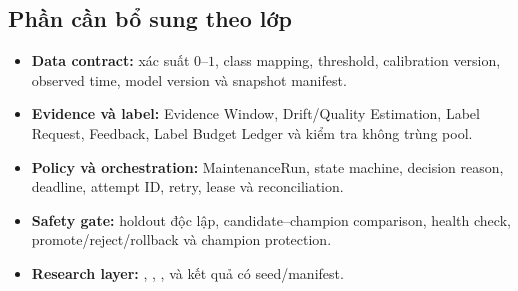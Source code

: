 \subsection{Phần cần bổ sung theo lớp}

\begin{itemize}
  \item \textbf{Data contract:} xác suất \(0\)--\(1\), class mapping, threshold, calibration version, observed time, model version và snapshot manifest.
  \item \textbf{Evidence và label:} Evidence Window, Drift/Quality Estimation, Label Request, Feedback, Label Budget Ledger và kiểm tra không trùng pool.
  \item \textbf{Policy và orchestration:} MaintenanceRun, state machine, decision reason, deadline, attempt ID, retry, lease và reconciliation.
  \item \textbf{Safety gate:} holdout độc lập, candidate--champion comparison, health check, promote/reject/rollback và champion protection.
  \item \textbf{Research layer:} , , ,  và kết quả có seed/manifest.
\end{itemize}
